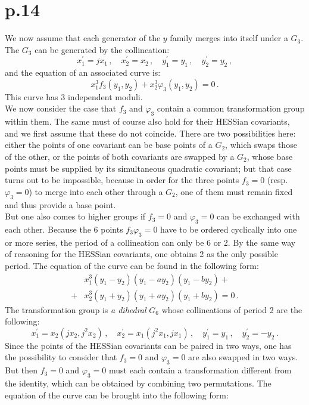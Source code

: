 \documentclass[leqno]{article}
\begin{document}
\section{p.14}
We now assume that each generator of the $y$ family merges into itself under a $G_3$. The $G_3$ can be generated by the collineation:
\[
x_1^\prime = j x_1 \, , \quad x_2^\prime = x_2 \, , \quad y_1^\prime = y_1 \, , \quad y_2^\prime = y_2 \, ,
\]
and the equation of an associated curve is:
\begin{equation}\label{eq: 5.9}
x_1^3 f_3 (y_1, y_2) + x_2^3 \varphi_3 (y_1, y_2) = 0 \, . \tag{9}
\end{equation}
This curve has 3 independent moduli. \\
We now consider the case that $f_3$ and $\varphi_3$ contain a common transformation group within them. The same must of course also hold for their HESSian covariants, and we first assume that these do not coincide. There are two possibilities here: either the points of one covariant can be base points of a $G_2$, which swaps those of the other, or the points of both covariants are swapped by a $G_2$, whose base points must be supplied by its simultaneous quadratic covariant; but that case turns out to be impossible, because in order for the three points $f_3=0$ (resp. $\varphi_3=0$) to merge into each other through a $G_2$, one of them must remain fixed and thus provide a base point. \\
But one also comes to higher groups if $f_3=0$ and $\varphi_3=0$ can be exchanged with each other. Because the 6 points $f_3 \varphi_3 = 0$ have to be ordered cyclically into one or more series, the period of a collineation can only be 6 or 2.
By the same way of reasoning for the HESSian covariants, one obtains 2 as the only possible period. The equation of the curve can be found in the following form:
\begin{align}\label{eq: 5.10}
 & x_1^3(y_1 - y_2)(y_1 - ay_2)(y_1 - b y_2) + \tag{10}\\ 
 +& x_2^3(y_1 + y_2)(y_1 + a y_2) (y_1 + b y_2) = 0 \, . \nonumber 
\end{align}
The transformation group is \textit{a dihedral} $G_6$ whose collineations of period 2 are the following:
\[
x_1^\prime = x_2 (j x_2, j^2 x_2) \, , \quad x_2^\prime = x_1 (j^2 x_1 , j x_1) \, , \quad y_1^\prime = y_1 \, , \quad y_2^\prime = - y_2 \, . 
\]
Since the points of the HESSian covariants can be paired in two ways, one has the possibility to consider that $f_3 = 0$ and $\varphi_3 = 0$ are also swapped in two ways. But then $f_3=0$ and $\varphi_3=0$ must each contain a transformation different from the identity, which can be obtained by combining two permutations. The equation of the curve can be brought into the following form:
\end{document}
